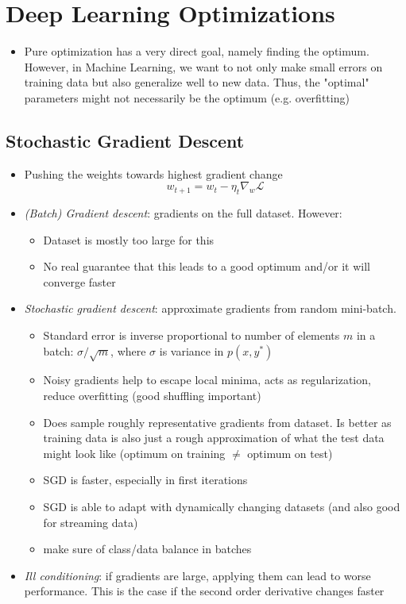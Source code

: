 \section{Deep Learning Optimizations}
\begin{itemize}
	\item Pure optimization has a very direct goal, namely finding the optimum. However, in Machine Learning, we want to not only make small errors on training data but also generalize well to new data. Thus, the "optimal" parameters might not necessarily be the optimum (e.g. overfitting)
\end{itemize}
\subsection{Stochastic Gradient Descent}
\begin{itemize}
	\item Pushing the weights towards highest gradient change
	$$w_{t+1} = w_{t} - \eta_t \nabla_{w} \mathcal{L}$$
	\item \textit{(Batch) Gradient descent}: gradients on the full dataset. However:
	\begin{itemize}
		\item Dataset is mostly too large for this
		\item No real guarantee that this leads to a good optimum and/or it will converge faster
	\end{itemize}
	\item \textit{Stochastic gradient descent}: approximate gradients from random mini-batch. 
	\begin{itemize}
		\item Standard error is inverse proportional to number of elements $m$ in a batch: $\sigma / \sqrt{m}$, where $\sigma$ is variance in $p(x,y^*)$
		\item Noisy gradients help to escape local minima, acts as regularization, reduce overfitting (good shuffling important)
		\item Does sample roughly representative gradients from dataset. Is better as training data is also just a rough approximation of what the test data might look like (optimum on training $\neq$ optimum on test)
		\item SGD is faster, especially in first iterations
		\item SGD is able to adapt with dynamically changing datasets (and also good for streaming data)
		\item make sure of class/data balance in batches
	\end{itemize}
	\item \textit{Ill conditioning}: if gradients are large, applying them can lead to worse performance. This is the case if the second order derivative changes faster 
\end{itemize}
